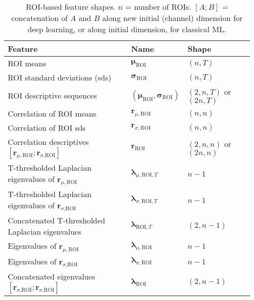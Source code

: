\documentclass[10pt]{article}
\newcommand{\tsub}[2]{\mathbf{#1}_{\text{#2}}}
\begin{document}
\begin{table}
	\centering
	\begin{tabular}{lll}
		\toprule
		Feature     & Name     & Shape  \\
		\midrule
    ROI means                                                                                  & \(\tsub{\mu}{ROI}\)                        & \((n, T)\)    \\
    ROI standard deviations (sds)                                                              & \(\tsub{\sigma}{ROI}\)                     & \((n, T)\)    \\
    ROI descriptive sequences                                                                  & \((\tsub{\mu}{ROI}, \tsub{\sigma}{ROI})\)  & \((2, n, T)\) or \((2n, T)\) \\
    Correlation of ROI means                                                                   & \(\mathbf{r}_{\mu,\text{ROI}}\)            & \((n, n)\)    \\
    Correlation of ROI sds                                                                     & \(\mathbf{r}_{\sigma,\text{ROI}}\)         & \((n, n)\)    \\
    Correlation descriptives \([\mathbf{r}_{\mu,\text{ROI}}; \mathbf{r}_{\sigma\text{,ROI}}]\) & \(\tsub{r}{ROI}\)                          & \((2, n, n)\) or \((2n, n)\)\\
    T-thresholded Laplacian eigenvalues of \(\mathbf{r}_{\mu,\text{ROI}}\)                     & \(\mathbf{\lambda}_{\mu,\text{ROI},T}\)    & \(n-1\)       \\
    T-thresholded Laplacian eigenvalues of \(\mathbf{r}_{\sigma\text{,ROI}}\)                  & \(\mathbf{\lambda}_{\sigma,\text{ROI},T}\) & \(n-1\)       \\
    Concatenated T-thresholded Laplacian eigenvalues                                           & \(\mathbf{\lambda}_{\text{ROI},T}\)        & \((2, n-1)\)  \\
    Eigenvalues of \(\mathbf{r}_{\mu,\text{ROI}}\)                                             & \(\mathbf{\lambda}_{\mu,\text{ROI}}\)      & \(n-1\)       \\
    Eigenvalues of \(\mathbf{r}_{\sigma\text{,ROI}}\)                                          & \(\mathbf{\lambda}_{\sigma,\text{ROI}}\)   & \(n-1\)       \\
    Concatenated eigenvalues \([\mathbf{r}_{\sigma\text{,ROI}}; \mathbf{r}_{\sigma\text{,ROI}}]\)  & \(\tsub{\lambda}{ROI}\)                & \((2, n-1)\)  \\
		\bottomrule
	\end{tabular}
	\label{tab:feature-shapes}
	\caption{ROI-based feature shapes. \(n\) = number of ROIs. \([A;B]\) = concatenation of \(A\) and \(B\) along new initial (channel) dimension for deep learning, or along initial dimension, for classical ML.}
\end{table}
\end{document}
